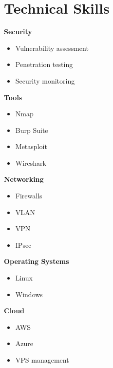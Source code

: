 \documentclass[10pt,a4paper]{article}
\begin{document}
	\section*{Technical Skills}
	
	\textbf{Security}
	
	\begin{itemize}
		
		\item Vulnerability assessment
		\item Penetration testing
		\item Security monitoring
		
	\end{itemize}
	
	\textbf{Tools}
	
	\begin{itemize}
		
		\item Nmap
		\item Burp Suite
		\item Metasploit
		\item Wireshark
		
	\end{itemize}
	
	\textbf{Networking}
	
	\begin{itemize}
		
		\item Firewalls
		\item VLAN
		\item VPN
		\item IPsec
		
	\end{itemize}
	
	\textbf{Operating Systems}
	
	\begin{itemize}
		
		\item Linux
		\item Windows
		
	\end{itemize}
	
	\textbf{Cloud}
	
	\begin{itemize}
		
		\item AWS
		\item Azure
		\item VPS management
		
	\end{itemize}
	
\end{document}
